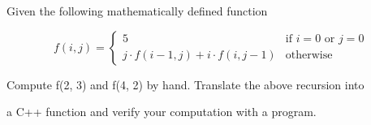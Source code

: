 Given the following mathematically defined function



\[

f(i, j) = \begin{cases}

5 & \text{if } i = 0 \text{ or } j = 0 \\

j \cdot f(i - 1, j) + i \cdot f(i, j - 1) & \text{otherwise}

\end{cases}

\]



Compute f(2, 3) and f(4, 2) by hand. Translate the above recursion into

a C++ function and verify your computation with a program.

